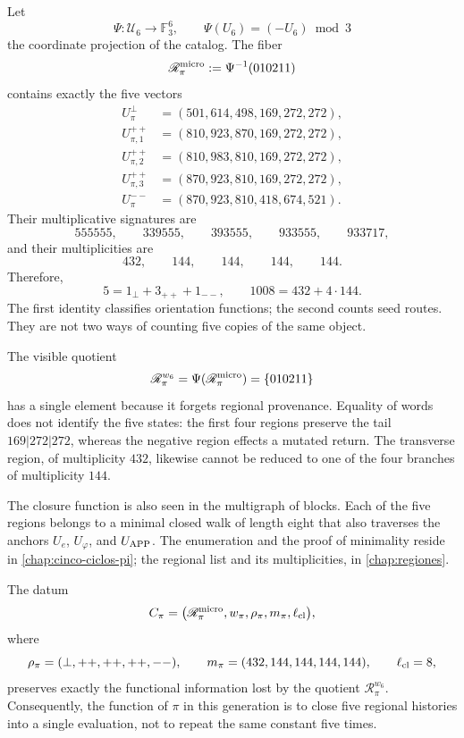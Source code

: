Let
\[
 \Psi:\mathcal U_6\longrightarrow\mathbb F_3^6,
 \qquad
 \Psi(U_6)=(-U_6)\bmod3
\]
the coordinate projection of the catalog. The fiber
\[
 \mathscr R_\pi^{\rm micro}
 :=\Psi^{-1}(010211)
\]
contains exactly the five vectors
\[
\begin{aligned}
U_\pi^\perp&=(501,614,498,169,272,272),\\
U_{\pi,1}^{++}&=(810,923,870,169,272,272),\\
U_{\pi,2}^{++}&=(810,983,810,169,272,272),\\
U_{\pi,3}^{++}&=(870,923,810,169,272,272),\\
U_\pi^{--}&=(870,923,810,418,674,521).
\end{aligned}
\]
Their multiplicative signatures are
\[
555555,\qquad339555,\qquad393555,\qquad933555,\qquad933717,
\]
and their multiplicities are
\[
432,\qquad144,\qquad144,\qquad144,\qquad144.
\]
Therefore,
\[
\boxed{
5=1_\perp+3_{++}+1_{--},
\qquad
1008=432+4\cdot144.}
\]
The first identity classifies orientation functions; the second counts
seed routes. They are not two ways of counting five copies of the same object.

The visible quotient
\[
 \mathscr R_\pi^{w_6}
 =\Psi(\mathscr R_\pi^{\rm micro})
 =\{010211\}
\]
has a single element because it forgets regional provenance. Equality of
words does not identify the five states: the first four regions
preserve the tail \(169|272|272\), whereas the negative region effects a
mutated return. The transverse region, of multiplicity \(432\), likewise cannot be
reduced to one of the four branches of multiplicity \(144\).

The closure function is also seen in the multigraph of blocks. Each of
the five regions belongs to a minimal closed walk of length eight that
also traverses the anchors \(U_e\), \(U_\varphi\), and \(U_{\rm APP}\).
The enumeration and the proof of minimality reside in
\cref{chap:cinco-ciclos-pi}; the regional list and its multiplicities, in
\cref{chap:regiones}.

\begin{proposition}
\label{prop:paquete-clausura-pi-rev6}
The datum
\[
 \mathfrak C_\pi=
 \bigl(
 \mathscr R_\pi^{\rm micro},
 w_\pi,
 \rho_\pi,
 m_\pi,
 \ell_{\rm cl}
 \bigr),
\]
where
\[
\rho_\pi=(\perp,++ ,++ ,++ ,--),\qquad
m_\pi=(432,144,144,144,144),\qquad
\ell_{\rm cl}=8,
\]
preserves exactly the functional information lost by the quotient
\(\mathscr R_\pi^{w_6}\). Consequently, the function of \(\pi\) in this
generation is to close five regional histories into a single evaluation,
not to repeat the same constant five times.
\end{proposition}

